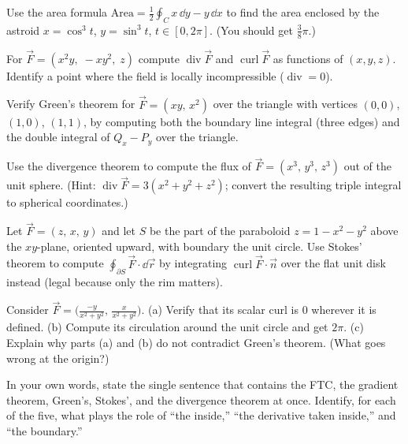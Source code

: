 \begin{exercise}
\label{ch35:exr-green-area}
Use the area formula $\text{Area}=\tfrac12\oint_C x\,\dd y - y\,\dd x$ to find the
area enclosed by the astroid $x=\cos^3 t$, $y=\sin^3 t$, $t\in[0,2\pi]$. (You should
get $\tfrac{3}{8}\pi$.)
\end{exercise}

\begin{exercise}
\label{ch35:exr-divcurl}
For $\vec F=(x^2 y,\; -xy^2,\; z)$ compute $\operatorname{div}\vec F$ and
$\operatorname{curl}\vec F$ as functions of $(x,y,z)$. Identify a point where the
field is locally incompressible ($\operatorname{div}=0$).
\end{exercise}

\begin{exercise}
\label{ch35:exr-greenverify}
Verify Green's theorem for $\vec F=(xy,\,x^2)$ over the triangle with vertices
$(0,0)$, $(1,0)$, $(1,1)$, by computing both the boundary line integral (three
edges) and the double integral of $Q_x-P_y$ over the triangle.
\end{exercise}

\begin{exercise}
\label{ch35:exr-divthm}
Use the divergence theorem to compute the flux of $\vec F=(x^3,\,y^3,\,z^3)$ out of
the unit sphere. (Hint: $\operatorname{div}\vec F = 3(x^2+y^2+z^2)$; convert the
resulting triple integral to spherical coordinates.)
\end{exercise}

\begin{exercise}
\label{ch35:exr-stokes}
Let $\vec F=(z,\,x,\,y)$ and let $S$ be the part of the paraboloid $z=1-x^2-y^2$
above the $xy$-plane, oriented upward, with boundary the unit circle. Use Stokes'
theorem to compute $\oint_{\partial S}\vec F\cdot\dd\vec r$ by integrating
$\operatorname{curl}\vec F\cdot\vec n$ over the flat unit disk instead (legal because
only the rim matters).
\end{exercise}

\begin{exercise}
\label{ch35:exr-hole}
Consider $\vec F=\big(\frac{-y}{x^2+y^2},\,\frac{x}{x^2+y^2}\big)$. (a) Verify that
its scalar curl is $0$ wherever it is defined. (b) Compute its circulation around
the unit circle and get $2\pi$. (c) Explain why parts (a) and (b) do not contradict
Green's theorem. (What goes wrong at the origin?)
\end{exercise}

\begin{exercise}
\label{ch35:exr-unify}
In your own words, state the single sentence that contains the FTC, the gradient
theorem, Green's, Stokes', and the divergence theorem at once. Identify, for each of
the five, what plays the role of ``the inside,'' ``the derivative taken inside,''
and ``the boundary.''
\end{exercise}
